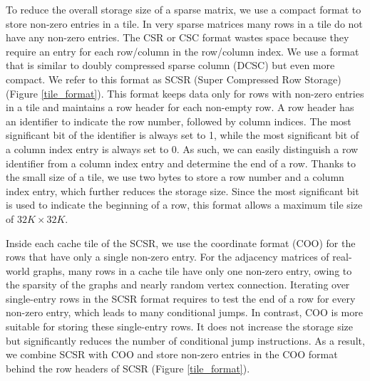 To reduce the overall storage size of a sparse matrix, we use a compact format
to store non-zero entries in a tile. In very sparse matrices many rows in a tile
do not have any non-zero entries. The CSR or CSC format wastes space because
they require an entry for each row/column in the row/column index.
We use a format that is similar to doubly
compressed sparse column (DCSC) \cite{Buluc08} but even more compact. We refer
to this format as SCSR (Super Compressed Row Storage) (Figure \ref{tile_format}).
This format keeps data only for rows with non-zero entries in a tile and
maintains a row header for each non-empty row. A row header has an identifier
to indicate the row number, followed by column indices. 
The most significant bit of the identifier is always set to 1, while the most
significant bit of a column index entry is always set to 0. As such, we can easily
distinguish a row identifier from a column index entry and determine the end
of a row. Thanks to the small size of a tile, we use two bytes to store a row
number and a column index entry, which further reduces the storage size. Since
the most significant bit is used to indicate the beginning of a row, this format
allows a maximum tile size of $32K \times 32K$.

Inside each cache tile of the SCSR, we use the coordinate format (COO) for
the rows that have only a single non-zero entry. For the adjacency matrices of
real-world graphs, many rows in a cache tile have only one non-zero entry,
owing to the sparsity of the graphs and nearly random vertex connection.
Iterating over single-entry rows in the SCSR format requires to test
the end of a row for every non-zero entry, which leads to many conditional jumps.
In contrast, COO is more suitable for storing these
single-entry rows. It does not increase the storage size but significantly
reduces the number of conditional jump instructions. As a result, we combine
SCSR with COO and store non-zero entries in the COO format behind the row headers
of SCSR (Figure \ref{tile_format}).


